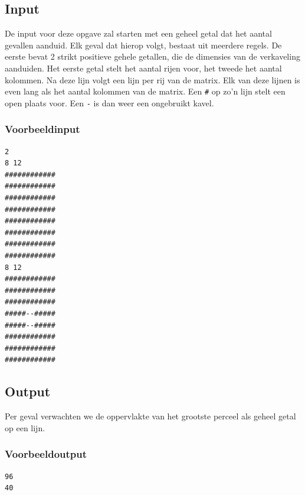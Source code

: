 \subsection*{Input}

De input voor deze opgave zal starten met een geheel getal dat het aantal
gevallen aanduid. Elk geval dat hierop volgt, bestaat uit meerdere regels. De
eerste bevat 2 strikt positieve gehele getallen, die de dimensies van de
verkaveling aanduiden. Het eerste getal stelt het aantal rijen voor, het tweede
het aantal kolommen. Na deze lijn volgt een lijn per rij van de matrix. Elk van
deze lijnen is even lang als het aantal kolommen van de matrix. Een \texttt{\#}
op zo'n lijn stelt een open plaats voor. Een \texttt{-} is dan weer een
ongebruikt kavel.

\subsubsection*{Voorbeeldinput}

\begin{verbatim}
2
8 12
############
############
############
############
############
############
############
############
8 12
############
############
############
#####--#####
#####--#####
############
############
############
\end{verbatim}

\subsection*{Output}

Per geval verwachten we de oppervlakte van het grootste perceel als geheel getal
op een lijn.

\subsubsection*{Voorbeeldoutput}

\begin{verbatim}
96
40
\end{verbatim}

